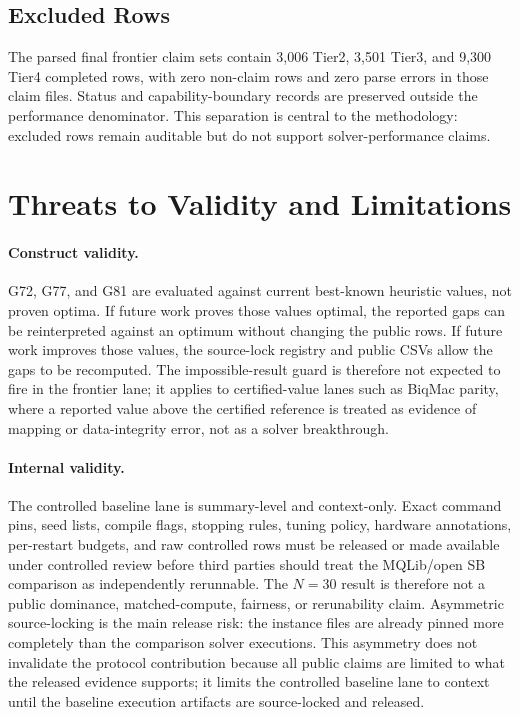 \documentclass[11pt]{article}
\begin{document}
\subsection{Excluded Rows}
The parsed final frontier claim sets contain 3,006 Tier2, 3,501 Tier3, and 9,300 Tier4 completed rows, with zero non-claim rows and zero parse errors in those claim files. Status and capability-boundary records are preserved outside the performance denominator. This separation is central to the methodology: excluded rows remain auditable but do not support solver-performance claims.

\section{Threats to Validity and Limitations}
\paragraph{Construct validity.}
G72, G77, and G81 are evaluated against current best-known heuristic values, not proven optima. If future work proves those values optimal, the reported gaps can be reinterpreted against an optimum without changing the public rows. If future work improves those values, the source-lock registry and public CSVs allow the gaps to be recomputed. The impossible-result guard is therefore not expected to fire in the frontier lane; it applies to certified-value lanes such as BiqMac parity, where a reported value above the certified reference is treated as evidence of mapping or data-integrity error, not as a solver breakthrough.

\paragraph{Internal validity.}
The controlled baseline lane is summary-level and context-only. Exact command pins, seed lists, compile flags, stopping rules, tuning policy, hardware annotations, per-restart budgets, and raw controlled rows must be released or made available under controlled review before third parties should treat the MQLib/open SB comparison as independently rerunnable. The $N=30$ result is therefore not a public dominance, matched-compute, fairness, or rerunability claim. Asymmetric source-locking is the main release risk: the instance files are already pinned more completely than the comparison solver executions. This asymmetry does not invalidate the protocol contribution because all public claims are limited to what the released evidence supports; it limits the controlled baseline lane to context until the baseline execution artifacts are source-locked and released.
\end{document}
